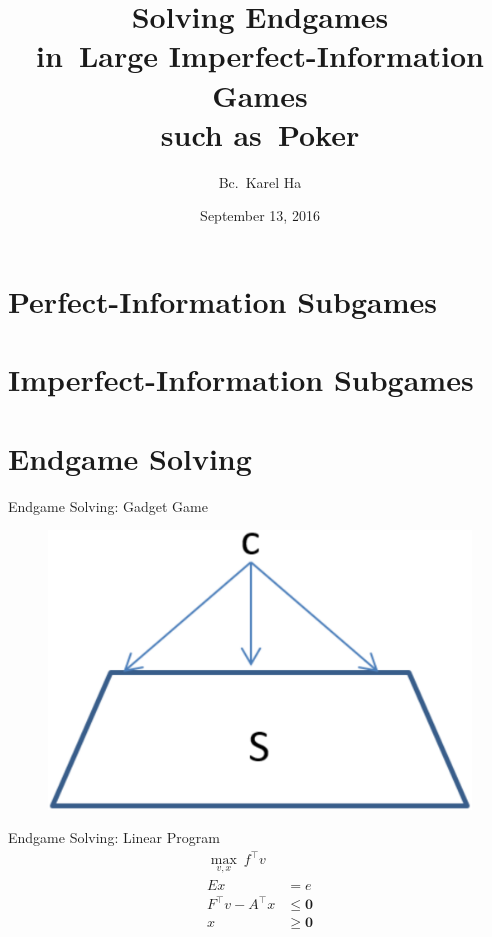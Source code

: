 \documentclass{beamer}
\title{Solving Endgames \\in~Large Imperfect-Information Games \\such as~Poker}
\date{September 13, 2016}
\author{Bc.~Karel Ha}
\institute{Department of~Applied Mathematics \\Charles University}
\theoremstyle{definition}
\newcommand{\vect}[1]{\boldsymbol{#1}}
\begin{document}
  \maketitle


  \section{Perfect-Information Subgames}

  \section{Imperfect-Information Subgames}

  \section{Endgame Solving}
  \begin{frame}{Endgame Solving: Gadget Game}
    \begin{figure}
      \centering
      \includegraphics[width=.5\textwidth]{../img/endgame-solving-gadget.png}
    \end{figure}
  \end{frame}

  \begin{frame}{Endgame Solving: Linear Program}
    \begin{equation*}
      \label{lp:endgame-solving}
      \begin{split}
        \max_{v, x}\  f^\top v & \\
        Ex &= e \\
        F^\top v - A^\top x &\le \vect{0} \\
        x &\ge \vect{0}
      \end{split}
    \end{equation*}
  \end{frame}
\end{document}
